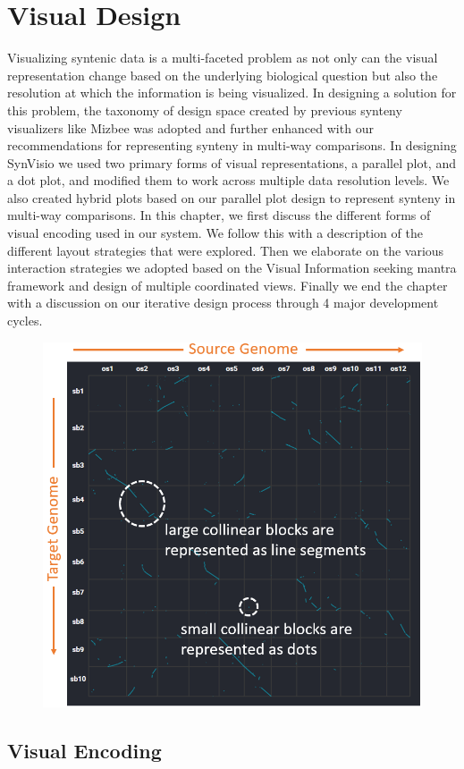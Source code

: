 \chapter{Visual Design}

Visualizing syntenic data is a multi-faceted problem as not only can the visual representation change based on the underlying biological question but also the resolution at which the information is being visualized. In designing a solution for this problem, the taxonomy of design space created by previous synteny visualizers like Mizbee \cite{Meyer2009} was adopted and further enhanced with our recommendations for representing synteny in multi-way comparisons. In designing SynVisio we used two primary forms of visual representations, a parallel plot, and a dot plot, and modified them to work across multiple data resolution levels. We also created hybrid plots based on our parallel plot design to represent synteny in multi-way comparisons. In this chapter, we first discuss the different forms of visual encoding used in our system. We follow this with a  description of the different layout strategies that were explored. Then we elaborate on the various interaction strategies we adopted based on the Visual Information seeking mantra framework and design of multiple coordinated views. Finally we end the chapter with a discussion on our iterative design process through 4 major development cycles.

\begin{figure}[h]
  \centering
  \includegraphics[width=.475\linewidth]{images/ch_4_dot_plot_a.PNG}
  \label{fig:ch_4_dot_plot_a}
\end{figure}


\section{Visual Encoding}

